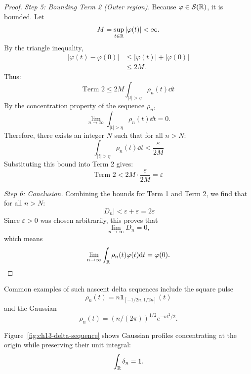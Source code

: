 \begin{proof}
\textit{Step 5: Bounding Term 2 (Outer region).}
Because $\varphi \in \mathcal{S}(\mathbb{R})$, it is bounded. Let
\[
M = \sup_{t \in \mathbb{R}} |\varphi(t)| < \infty.
\]
By the triangle inequality,
\[
\begin{aligned}
|\varphi(t) - \varphi(0)| &\leq |\varphi(t)| + |\varphi(0)| \\
&\leq 2M.
\end{aligned}
\]
Thus:
\begin{equation}
\text{Term 2} \leq 2M \int_{|t| > \eta} \rho_n(t) \dd t
\end{equation}
By the concentration property of the sequence $\rho_n$,
\[
\lim_{n \to \infty} \int_{|t| > \eta} \rho_n(t) \dd t = 0.
\]
Therefore, there exists an integer $N$ such that for all $n > N$:
\begin{equation}
\int_{|t| > \eta} \rho_n(t) \dd t < \frac{\varepsilon}{2M}
\end{equation}
Substituting this bound into Term 2 gives:
\begin{equation}
\text{Term 2} < 2M \cdot \frac{\varepsilon}{2M} = \varepsilon
\end{equation}

\textit{Step 6: Conclusion.}
Combining the bounds for Term 1 and Term 2, we find that for all $n > N$:
\begin{equation}
|D_n| < \varepsilon + \varepsilon = 2\varepsilon
\end{equation}
Since $\varepsilon > 0$ was chosen arbitrarily, this proves that
\[
\lim_{n \to \infty} D_n = 0,
\]
which means
\[
\lim_{n \to \infty} \int_{\mathbb{R}} \rho_n(t) \varphi(t) \mathrm{d} t = \varphi(0).
\]

\end{proof}

Common examples of such nascent delta sequences include the square pulse
\[
\rho_n(t) = n \mathbf{1}_{[-1/2n, 1/2n]}(t)
\]
and the Gaussian
\[
\rho_n(t) = (n/(2\pi))^{1/2} e^{-nt^2/2}.
\]

Figure~\ref{fig:ch13-delta-sequence} shows Gaussian profiles concentrating at the origin while preserving their unit integral:
\[
\int_{\mathbb{R}} \delta_n = 1.
\]

